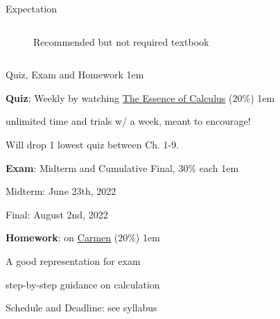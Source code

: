 \documentclass[11pt,aspectratio=43]{beamer}
\let\olditemize=\itemize
\let\endolditemize=\enditemize
\renewenvironment{itemize}{\olditemize \itemsep1em}{\endolditemize}
\theoremstyle{definition}
\begin{document}
\begin{frame}{Expectation}
\begin{columns}
\begin{column}{0.4\textwidth}
\begin{figure}
                \caption{Recommended but not required textbook}
            \end{figure}
        \end{column}
    \end{columns}
\end{frame}

\begin{frame}{Quiz, Exam and Homework}
\label{slide:Exam__Quiz_and_Homework}
    \begin{itemize}
        \item \textbf{Quiz}: Weekly by watching \alert{\href{https://www.youtube.com/watch?v=WUvTyaaNkzM&list=PLZHQObOWTQDMsr9K-rj53DwVRMYO3t5Yr}{The Essence of Calculus}} ($ 20\% $)
        \begin{itemize}
            \item \alert{unlimited} time and trials w/ a week, meant to encourage!
            \item Will drop 1 lowest quiz between Ch. 1-9.
        \end{itemize}
        \item \textbf{Exam}: Midterm and Cumulative Final, $ 30\% $ each
            \begin{itemize}
                \item Midterm: \alert{June 23th, 2022}
                \item Final: \alert{August 2nd, 2022}
            \end{itemize}
        \item \textbf{Homework}: on \alert{\href{https://osu.instructure.com/courses/121985}{Carmen}} ($20\%$)
        \begin{itemize}
            \item A good representation for exam
            \item step-by-step guidance on calculation
        \end{itemize}
        \item Schedule and Deadline: see syllabus
    \end{itemize}
\end{frame}
\end{document}
